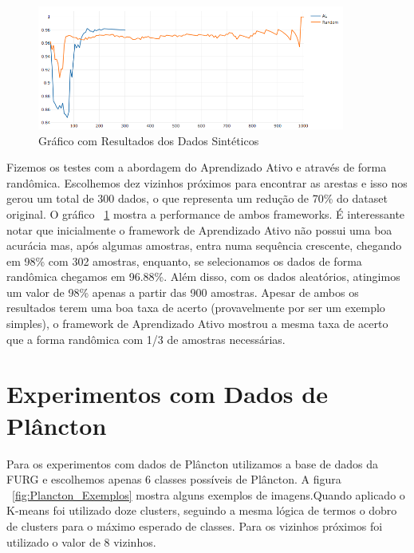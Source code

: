\begin{figure}
  \centering
  \includegraphics[width=0.9\textwidth]{figures/grafico_exemplo_sintetico.png}
  \caption{Gráfico com Resultados dos Dados Sintéticos}
  \label{fig:grafico_exemplo_sintetico}
\end{figure}

Fizemos os testes com a abordagem do Aprendizado Ativo e através de forma randômica. Escolhemos dez vizinhos próximos para encontrar as arestas e isso nos gerou um total de 300 dados, o que representa um redução de 70\% do dataset original. O gráfico ~\ref{fig:grafico_exemplo_sintetico} mostra a performance de ambos frameworks. É interessante notar que inicialmente o framework de Aprendizado Ativo não possui uma boa acurácia mas, após algumas amostras, entra numa sequência crescente, chegando em 98\% com 302 amostras, enquanto, se selecionamos os dados de forma randômica chegamos em 96.88\%. Além disso, com os dados aleatórios, atingimos um valor de 98\% apenas a partir das 900 amostras. Apesar de ambos os resultados terem uma boa taxa de acerto (provavelmente por ser um exemplo simples), o framework de Aprendizado Ativo mostrou a mesma taxa de acerto que a forma randômica com 1/3 de amostras necessárias. 


\section{Experimentos com Dados de Plâncton}
\label{sec:experimentos_plancton}

Para os experimentos com dados de Plâncton utilizamos a base de dados da FURG e escolhemos apenas 6 classes possíveis de Plâncton. A figura ~\ref{fig:Plancton_Exemplos} mostra alguns exemplos de imagens.Quando aplicado o K-means foi utilizado doze clusters, seguindo a mesma lógica de termos o dobro de clusters para o máximo esperado de classes. Para os vizinhos próximos foi utilizado o valor de 8 vizinhos. 


